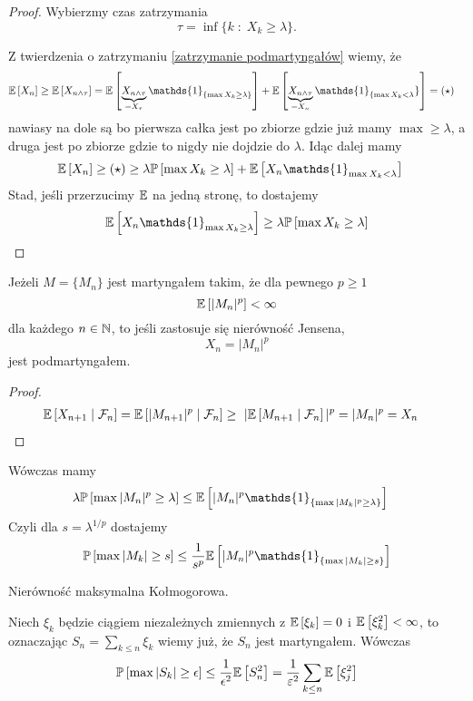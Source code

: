 \begin{proof}
  Wybierzmy czas zatrzymania
  $$\tau=\inf\{k\;:\;X_k\geq\lambda\}.$$

  Z twierdzenia o zatrzymaniu \ref{zatrzymanie podmartyngałów} wiemy, że
  \begin{align*}
  \expected{X_n}&\geq\expected{X_{n\land\tau}}= \expected{\underbrace{X_{n\land\tau}}_{=X_\tau}\mathds{1}_{\{\max  X_k\geq \lambda\}}}+\expected{\underbrace{X_{n\land\tau}}_{=X_n}\mathds{1}_{\{\max X_k<\lambda}\}}=(\star)
  \end{align*}
  nawiasy na dole są bo pierwsza całka jest po zbiorze gdzie już mamy $\max\geq \lambda$, a druga jest po zbiorze gdzie to nigdy nie dojdzie do $\lambda$. Idąc dalej mamy
  \begin{align*}
    \expected{X_n}\geq (\star)&\geq \lambda\prob{\max X_k\geq\lambda}+\expected{X_n\mathds{1}_{\max X_k<\lambda}}
  \end{align*}
  Stad, jeśli przerzucimy $\expected$ na jedną stronę, to dostajemy
  $$\expected{X_n\mathds{1}_{\max X_k\geq \lambda}}\geq \lambda\prob{\max X_k\geq\lambda}$$
\end{proof}

\begin{conclusion}
  Jeżeli $M=\{M_n\}$ jest martyngałem takim, że dla pewnego $p\geq1$
  $$\expected{|M_n|^p}<\infty$$
  dla każdego $n\in\operatorname{\mathbb{N}}$, to jeśli zastosuje się nierówność Jensena,
  $$X_n=|M_n|^p$$
  jest podmartyngałem.
\end{conclusion}

\begin{proof}
  \begin{align*}
    \expected{X_{n+1}}{\set{F}_n}&=\expected{|M_{n+1}|^p}{\set{F}_n}\geq\ |\expected{M_{n+1}}{\set{F}_n}|^p=|M_n|^p=X_n
  \end{align*}
\end{proof}

Wówczas mamy
\begin{align*}
  \lambda\prob{\max|M_n|^p\geq\lambda}&\leq\expected{|M_n|^p\mathds{1}_{\{\max |M_k|^p\geq\lambda\}}}
\end{align*}
  Czyli dla $s=\lambda^{1/p}$ dostajemy
  $$\prob{\max |M_k|\geq s}\leq \frac{1}{s^p}\expected{|M_n|^p\mathds{1}_{\{\max |M_k|\geq s\}}}$$

\begin{example}
  \item Nierówność maksymalna Kołmogorowa.

    Niech $\xi_k$ będzie ciągiem niezależnych zmiennych z $\expected{\xi_k}=0$ i $\expected{\xi_k^2}<\infty$, to oznaczając $S_n=\sum_{k\leq n}\xi_k$ wiemy już, że $S_n$ jest martyngałem. Wówczas
    $$\prob{\max |S_k|\geq\epsilon}\leq\frac{1}{\epsilon^2}\expected{S_n^2}=\frac{1}{\varepsilon^2}\sum_{k\leq n}\expected{\xi_j^2}$$
\end{example}

